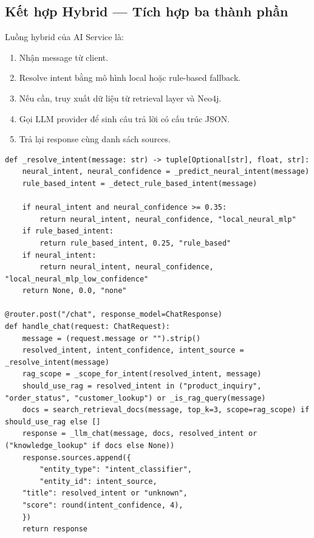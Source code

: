 \documentclass[12pt,a4paper]{article}
\begin{document}
\subsection{Kết hợp Hybrid --- Tích hợp ba thành phần}
Luồng hybrid của AI Service là:
\begin{enumerate}
  \item Nhận message từ client.
  \item Resolve intent bằng mô hình local hoặc rule-based fallback.
  \item Nếu cần, truy xuất dữ liệu từ retrieval layer và Neo4j.
  \item Gọi LLM provider để sinh câu trả lời có cấu trúc JSON.
  \item Trả lại response cùng danh sách sources.
\end{enumerate}

\begin{lstlisting}[style=code,caption={Resolve intent và xử lý endpoint chat}]
def _resolve_intent(message: str) -> tuple[Optional[str], float, str]:
    neural_intent, neural_confidence = _predict_neural_intent(message)
    rule_based_intent = _detect_rule_based_intent(message)

    if neural_intent and neural_confidence >= 0.35:
        return neural_intent, neural_confidence, "local_neural_mlp"
    if rule_based_intent:
        return rule_based_intent, 0.25, "rule_based"
    if neural_intent:
        return neural_intent, neural_confidence, "local_neural_mlp_low_confidence"
    return None, 0.0, "none"

@router.post("/chat", response_model=ChatResponse)
def handle_chat(request: ChatRequest):
    message = (request.message or "").strip()
    resolved_intent, intent_confidence, intent_source = _resolve_intent(message)
    rag_scope = _scope_for_intent(resolved_intent, message)
    should_use_rag = resolved_intent in ("product_inquiry", "order_status", "customer_lookup") or _is_rag_query(message)
    docs = search_retrieval_docs(message, top_k=3, scope=rag_scope) if should_use_rag else []
    response = _llm_chat(message, docs, resolved_intent or ("knowledge_lookup" if docs else None))
    response.sources.append({
        "entity_type": "intent_classifier",
        "entity_id": intent_source,
    "title": resolved_intent or "unknown",
    "score": round(intent_confidence, 4),
    })
    return response
\end{lstlisting}
\end{document}
